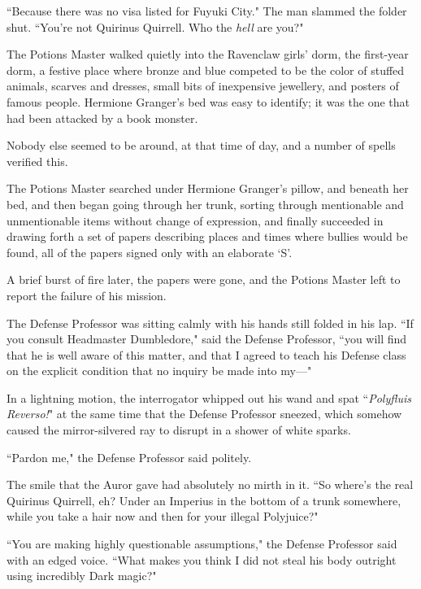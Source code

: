 ``Because there was no visa listed for Fuyuki City." The man slammed the folder shut. ``You're not Quirinus Quirrell. Who the \emph{hell} are you?"

\later

The Potions Master walked quietly into the Ravenclaw girls' dorm, the first-year dorm, a festive place where bronze and blue competed to be the color of stuffed animals, scarves and dresses, small bits of inexpensive jewellery, and posters of famous people. Hermione Granger's bed was easy to identify; it was the one that had been attacked by a book monster.

Nobody else seemed to be around, at that time of day, and a number of spells verified this.

The Potions Master searched under Hermione Granger's pillow, and beneath her bed, and then began going through her trunk, sorting through mentionable and unmentionable items without change of expression, and finally succeeded in drawing forth a set of papers describing places and times where bullies would be found, all of the papers signed only with an elaborate `S'.

A brief burst of fire later, the papers were gone, and the Potions Master left to report the failure of his mission.

\later

The Defense Professor was sitting calmly with his hands still folded in his lap. ``If you consult Headmaster Dumbledore," said the Defense Professor, ``you will find that he is well aware of this matter, and that I agreed to teach his Defense class on the explicit condition that no inquiry be made into my—"

In a lightning motion, the interrogator whipped out his wand and spat ``\emph{Polyfluis Reverso!}" at the same time that the Defense Professor sneezed, which somehow caused the mirror-silvered ray to disrupt in a shower of white sparks.

``Pardon me," the Defense Professor said politely.

The smile that the Auror gave had absolutely no mirth in it. ``So where's the real Quirinus Quirrell, eh? Under an Imperius in the bottom of a trunk somewhere, while you take a hair now and then for your illegal Polyjuice?"

``You are making highly questionable assumptions," the Defense Professor said with an edged voice. ``What makes you think I did not steal his body outright using incredibly Dark magic?"

